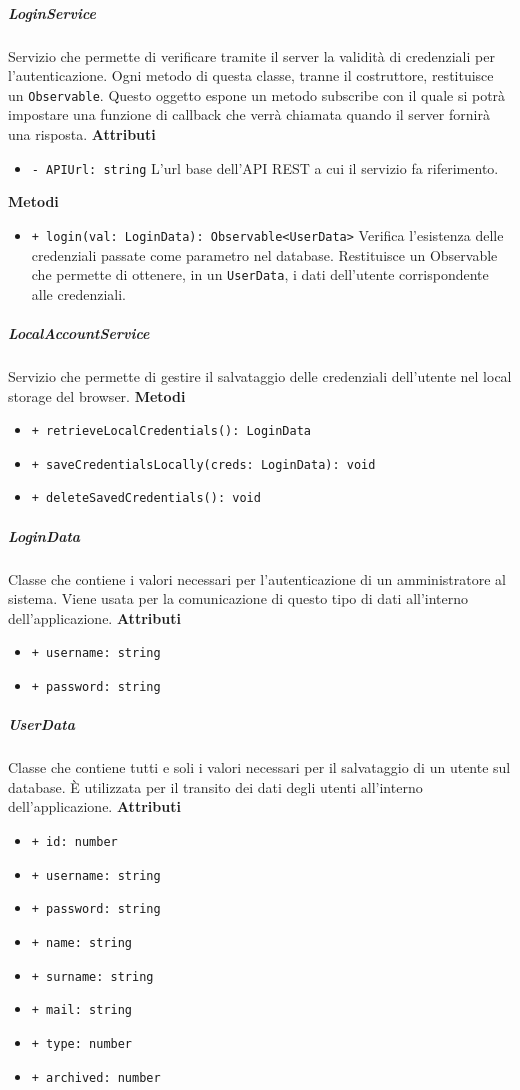 \subparagraph{LoginService}
Servizio che permette di verificare tramite il server la validità di credenziali per l'autenticazione. Ogni metodo di questa classe, tranne il costruttore, restituisce un \texttt{Observable}. Questo oggetto espone un metodo subscribe con il quale si potrà impostare una funzione di callback che verrà chiamata quando il server fornirà una risposta. \newline
\textbf{Attributi}
\begin{itemize}
	\item \texttt{- APIUrl: string}
	L'url base dell'API REST a cui il servizio fa riferimento.
\end{itemize}
\textbf{Metodi}
\begin{itemize}
	\item \texttt{+ login(val: LoginData): Observable<UserData>} \newline
	Verifica l'esistenza delle credenziali passate come parametro nel database. Restituisce un Observable che permette di ottenere, in un \texttt{UserData}, i dati dell'utente corrispondente alle credenziali.
\end{itemize}
\subparagraph{LocalAccountService}
Servizio che permette di gestire il salvataggio delle credenziali dell'utente nel local storage del browser. \newline
\textbf{Metodi}
\begin{itemize}
	\item \texttt{+ retrieveLocalCredentials(): LoginData}
	\item \texttt{+ saveCredentialsLocally(creds: LoginData): void}
	\item \texttt{+ deleteSavedCredentials(): void}
\end{itemize}
\subparagraph{LoginData}
Classe che contiene i valori necessari per l'autenticazione di un amministratore al sistema. Viene usata per la comunicazione di questo tipo di dati all'interno dell'applicazione. \newline
\textbf{Attributi}
\begin{itemize}
	\item \texttt{+ username: string}
	\item \texttt{+ password: string}
\end{itemize}
\subparagraph{UserData}
Classe che contiene tutti e soli i valori necessari per il salvataggio di un utente sul database. È utilizzata per il transito dei dati degli utenti all'interno dell'applicazione. \newline
\textbf{Attributi}
\begin{itemize}
	\item \texttt{+ id: number}
	\item \texttt{+ username: string}
	\item \texttt{+ password: string}
	\item \texttt{+ name: string}
	\item \texttt{+ surname: string}
	\item \texttt{+ mail: string}
	\item \texttt{+ type: number}
	\item \texttt{+ archived: number}
\end{itemize}
